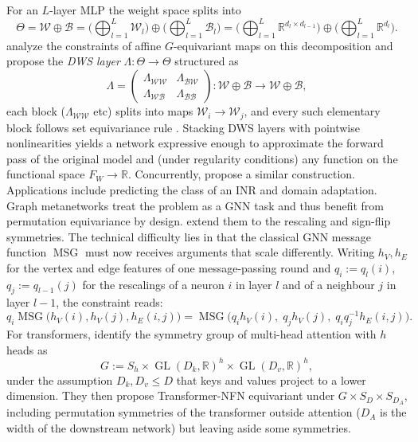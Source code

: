 \documentclass[mathematics,review,submit,moreauthors]{Definitions/mdpi}
\begin{document}
For an $L$-layer MLP the weight space splits into
\begin{equation*}
    \Theta=\mathcal{W}\oplus\mathcal{B}=\Big(\bigoplus_{l=1}^{L}\mathcal{W}_l\Big)\oplus\Big(\bigoplus_{l=1}^{L}\mathcal{B}_l\Big)=\Big(\bigoplus_{l=1}^{L}\mathbb{R}^{d_l\times d_{l-1}}\Big)\oplus\Big(\bigoplus_{l=1}^{L}\mathbb{R}^{d_l}\Big).
\end{equation*}
\citet{navon2023p4icml} analyze the constraints of affine $G$-equivariant maps on this decomposition and propose the \emph{DWS layer} $\Lambda:\Theta\to\Theta$ structured as
\begin{equation*}
    \Lambda=\begin{pmatrix}\Lambda_{\mathcal{W}\mathcal{W}} & \Lambda_{\mathcal{B}\mathcal{W}}\\[2pt] \Lambda_{\mathcal{W}\mathcal{B}} & \Lambda_{\mathcal{B}\mathcal{B}}\end{pmatrix}:\mathcal{W}\oplus\mathcal{B}\longrightarrow\mathcal{W}\oplus\mathcal{B},
\end{equation*}
each block ($\Lambda_{\mathcal{W}\mathcal{W}}$ etc) splits into maps $\mathcal{W}_i\to\mathcal{W}_j$, and every such elementary block follows set equivariance rule \citep{zaheer2018}.
Stacking DWS layers with pointwise nonlinearities yields a network expressive enough to approximate the forward pass of the original model and (under regularity conditions) any function on the functional space $F_W\to \mathbb R$.
Concurrently, \citet{zhou2023} propose a similar construction.
Applications include predicting the class of an INR and domain adaptation.
Graph metanetworks \citep{lim2024iclr,kofinas2024iclr} treat the problem as a GNN task and thus benefit from permutation equivariance by design. 
\citet{kalogeropoulos2024} extend them to the rescaling and sign-flip symmetries.
The technical difficulty lies in that the classical GNN message function $\operatorname{MSG}$ must now receives arguments that scale differently.
Writing $h_V,h_E$ for the vertex and edge features of one message-passing round and $q_i:=q_l(i)$, $q_j:=q_{l-1}(j)$ for the rescalings of a neuron $i$ in layer $l$ and of a neighbour $j$ in layer $l-1$, the constraint reads:
\begin{equation*}
    q_i\operatorname{MSG}\big(h_V(i),h_V(j),h_E(i,j)\big)=\operatorname{MSG}\big(q_ih_V(i),\;q_jh_V(j),\;q_iq_j^{-1}h_E(i,j)\big).
\end{equation*}
For transformers, \citet{tran2025iclr} identify the symmetry group of multi-head attention with $h$ heads as
\begin{equation*}
    G:=S_h\times \operatorname{GL}(D_k,\mathbb{R})^{h}\times \operatorname{GL}(D_v,\mathbb{R})^{h},
\end{equation*}
under the assumption $D_k,D_v\le D$ that keys and values project to a lower dimension.
They then propose Transformer-NFN equivariant under $G\times S_D\times S_{D_A}$, including permutation symmetries of the transformer outside attention ($D_A$ is the width of the downstream network) but leaving aside some symmetries.
\end{document}
